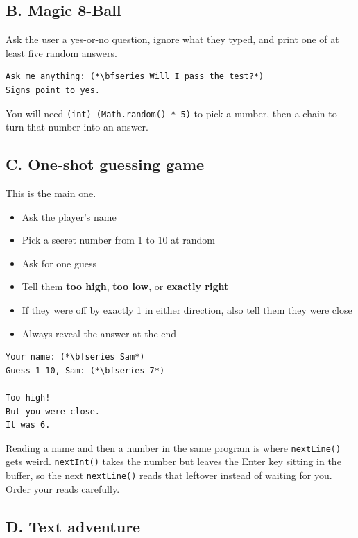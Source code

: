 \documentclass[11pt]{article}
\newcommand{\code}[1]{\texttt{#1}}
\begin{document}
\subsection*{B. Magic 8-Ball}

Ask the user a yes-or-no question, ignore what they typed, and print one of at least five random answers.

\begin{lstlisting}[style=term]
Ask me anything: (*\bfseries Will I pass the test?*)
Signs point to yes.
\end{lstlisting}

You will need \code{(int) (Math.random() * 5)} to pick a number, then a chain to turn that number into an answer.

\subsection*{C. One-shot guessing game}

This is the main one.

\begin{itemize}
\item Ask the player's name
\item Pick a secret number from 1 to 10 at random
\item Ask for one guess
\item Tell them \textbf{too high}, \textbf{too low}, or \textbf{exactly right}
\item If they were off by exactly 1 in either direction, also tell them they were close
\item Always reveal the answer at the end
\end{itemize}

\begin{lstlisting}[style=term]
Your name: (*\bfseries Sam*)
Guess 1-10, Sam: (*\bfseries 7*)

Too high!
But you were close.
It was 6.
\end{lstlisting}

\begin{note}[bronze]
Reading a name and then a number in the same program is where \code{nextLine()} gets weird. \code{nextInt()} takes the number but leaves the Enter key sitting in the buffer, so the next \code{nextLine()} reads that leftover instead of waiting for you. Order your reads carefully.
\end{note}

\subsection*{D. Text adventure}
\end{document}
